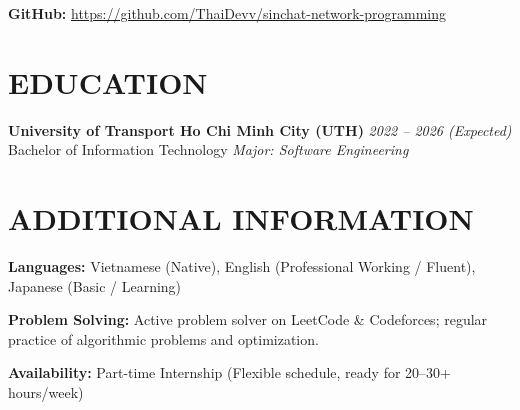 \documentclass[10pt,a4paper]{extarticle}
\begin{document}
\textbf{GitHub:}
\href{https://github.com/ThaiDevv/sinchat-network-programming}
{https://github.com/ThaiDevv/sinchat-network-programming}


\section{EDUCATION}

\textbf{University of Transport Ho Chi Minh City (UTH)}
\hfill \textit{2022 -- 2026 (Expected)}\\
Bachelor of Information Technology
\hfill \textit{Major: Software Engineering}


\section{ADDITIONAL INFORMATION}

\textbf{Languages:}
Vietnamese (Native), English (Professional Working / Fluent), Japanese (Basic / Learning)

\textbf{Problem Solving:}
Active problem solver on LeetCode \& Codeforces; regular practice of algorithmic problems and optimization.

\textbf{Availability:}
Part-time Internship (Flexible schedule, ready for 20--30+ hours/week)
\end{document}
